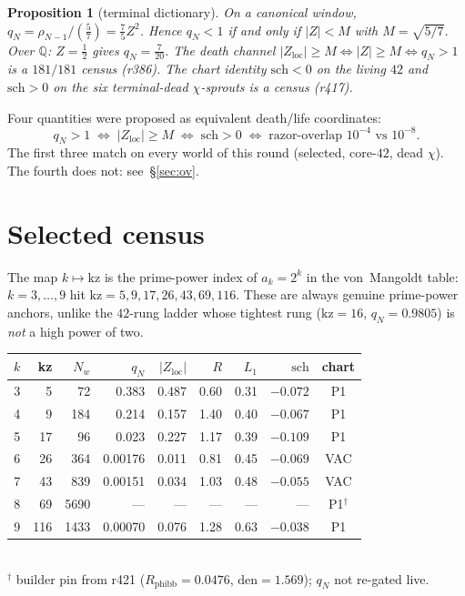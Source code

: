 \documentclass[11pt]{article}
\newtheorem{prop}{Proposition}
\theoremstyle{remark}
\newcommand{\Zloc}{Z_{\mathrm{loc}}}
\begin{document}
\begin{prop}[terminal dictionary]\label{prop:dict}
On a canonical window,
$q_N=\rho_{N-1}/(\tfrac57)=\tfrac75 Z^2$.
Hence $q_N<1$ if and only if $\lvert Z\rvert<M$
with $M=\sqrt{5/7}$.
Over $\mathbb{Q}$: $Z=\tfrac12$ gives
$q_N=\tfrac7{20}$.
The death channel
$\lvert\Zloc\rvert\ge M\iff\lvert Z\rvert\ge M\iff q_N>1$
is a $181/181$ census (r386).
The chart identity $\mathrm{sch}<0$ on the
living $42$ and $\mathrm{sch}>0$ on the six
terminal-dead $\chi$-sprouts is a census (r417).
\end{prop}

Four quantities were proposed as equivalent
death/life coordinates:
\[
  q_N>1
  \;\iff\;
  \lvert\Zloc\rvert\ge M
  \;\iff\;
  \mathrm{sch}>0
  \;\iff\;
  \text{razor-overlap }10^{-4}\text{ vs }10^{-8}.
\]
The first three match on every world of this
round (selected, core-$42$, dead $\chi$).
The fourth does not: see~\S\ref{sec:ov}.

\section{Selected census}\label{sec:sel}

The map $k\mapsto\mathrm{kz}$ is the prime-power
index of $a_k=2^k$ in the von~Mangoldt table:
$k=3,\ldots,9$ hit $\mathrm{kz}=5,9,17,26,43,69,116$.
These are always genuine prime-power anchors,
unlike the $42$-rung ladder whose tightest rung
($\mathrm{kz}=16$, $q_N=0.9805$) is \emph{not}
a high power of two.

\begin{center}
\small
\begin{tabular}{@{}rrrrrrrrc@{}}
\toprule
$k$ & kz & $N_w$ & $q_N$ & $\lvert\Zloc\rvert$ & $R$ & $L_1$ & $\mathrm{sch}$ & chart \\
\midrule
3 & 5 & 72 & 0.383 & 0.487 & 0.60 & 0.31 & $-0.072$ & P1 \\
4 & 9 & 184 & 0.214 & 0.157 & 1.40 & 0.40 & $-0.067$ & P1 \\
5 & 17 & 96 & 0.023 & 0.227 & 1.17 & 0.39 & $-0.109$ & P1 \\
6 & 26 & 364 & 0.00176 & 0.011 & 0.81 & 0.45 & $-0.069$ & VAC \\
7 & 43 & 839 & 0.00151 & 0.034 & 1.03 & 0.48 & $-0.055$ & VAC \\
8 & 69 & 5690 & --- & --- & --- & --- & --- & P1$^\dagger$ \\
9 & 116 & 1433 & 0.00070 & 0.076 & 1.28 & 0.63 & $-0.038$ & P1 \\
\bottomrule
\end{tabular}\\[2pt]
{\footnotesize $^\dagger$ builder pin from r421
($R_{\mathrm{phibb}}=0.0476$, $\mathrm{den}=1.569$);
$q_N$ not re-gated live.}
\end{center}
\end{document}
